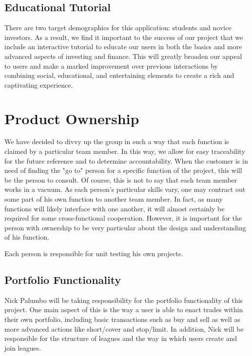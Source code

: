 \documentclass[11pt,letterpaper,oneside]{memoir}
\begin{document}
\section{Educational Tutorial}

There are two target demographics for this application: students and novice investors. As a
result, we find it important to the success of our project that we include an interactive
tutorial to educate our users in both the basics and more advanced aspects of investing
and finance. This will greatly broaden our appeal to users and make a marked improvement over
previous interactions by combining social, educational, and entertaining elements to create
a rich and captivating experience.

\chapter{Product Ownership}

We have decided to divvy up the group in such a way that each function is claimed by a
particular team member. In this way, we allow for easy traceability for the future reference
and to determine accountability. When the customer is in need of finding the "go to" person for
a specific function of the project, this will be the person to consult. Of course, this
is not to say that each team member works in a vacuum. As each person's particular skills vary,
one may contract out some part of his own function to another team member. In fact, as many
functions will likely interface with one another, it will almost certainly be required for some
cross-functional cooperation. However, it is important for the person with ownership to be very
particular about the design and understanding of his function.

Each person is responsible for unit testing his own projects.

\section{Portfolio Functionality}
Nick Palumbo will be taking responsibility for the portfolio functionality of this project. One main
aspect of this is the way a user is able to enact trades within their own portfolio, including basic
transactions such as buy and sell as well as more advanced actions like short/cover and stop/limit.
In addition, Nick will be responsible for the structure of leagues and the way in which users create
and join leagues.
\end{document}
